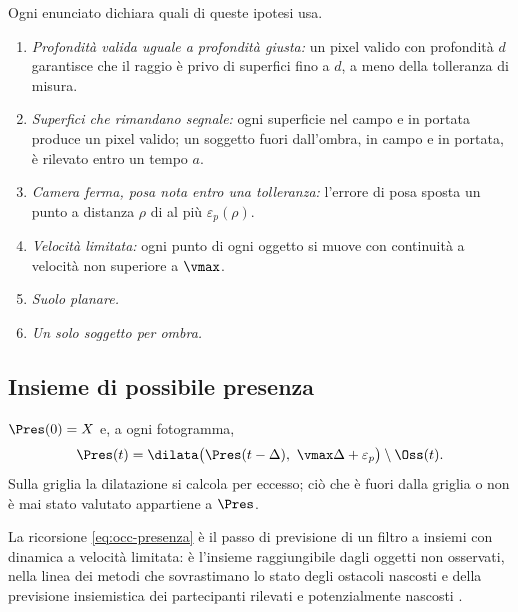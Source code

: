 \begin{ipotesi}[Modello]\label{ip:occ-modello}
Ogni enunciato dichiara quali di queste ipotesi usa.
\begin{enumerate}[label=(\roman*),itemsep=0pt]
\item \emph{Profondità valida uguale a profondità giusta:} un pixel valido con profondità $d$ garantisce che il raggio è privo di superfici fino a $d$, a meno della tolleranza di misura.
\item \emph{Superfici che rimandano segnale:} ogni superficie nel campo e in portata produce un pixel valido; un soggetto fuori dall'ombra, in campo e in portata, è rilevato entro un tempo $a$.
\item \emph{Camera ferma, posa nota entro una tolleranza:} l'errore di posa sposta un punto a distanza $\rho$ di al più $\varepsilon_p(\rho)$.
\item \emph{Velocità limitata:} ogni punto di ogni oggetto si muove con continuità a velocità non superiore a $\vmax$.
\item \emph{Suolo planare.}
\item \emph{Un solo soggetto per ombra.}
\end{enumerate}
\end{ipotesi}

\subsection{Insieme di possibile presenza}\label{sec:occ-presenza}

\begin{definizione}\label{def:occ-presenza}
$\Pres(0)=X$ e, a ogni fotogramma,
\begin{equation}\label{eq:occ-presenza}
\Pres(t)=\dilata\bigl(\Pres(t-\Delta),\ \vmax\Delta+\varepsilon_p\bigr)\setminus\Oss(t).
\end{equation}
Sulla griglia la dilatazione si calcola per eccesso; ciò che è fuori dalla griglia o non è mai stato valutato appartiene a $\Pres$.
\end{definizione}

La ricorsione \eqref{eq:occ-presenza} è il passo di previsione di un filtro a insiemi con dinamica a velocità limitata: è l'insieme raggiungibile dagli oggetti non osservati, nella linea dei metodi che sovrastimano lo stato degli ostacoli nascosti \cite{orzechowski2018} e della previsione insiemistica dei partecipanti rilevati e potenzialmente nascosti \cite{koschi2021}.

